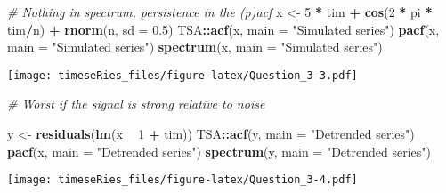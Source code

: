 \documentclass[]{book}
\newenvironment{Shaded}{\begin{snugshade}}{\end{snugshade}}
\newcommand{\KeywordTok}[1]{\textcolor[rgb]{0.13,0.29,0.53}{\textbf{#1}}}
\newcommand{\DataTypeTok}[1]{\textcolor[rgb]{0.13,0.29,0.53}{#1}}
\newcommand{\DecValTok}[1]{\textcolor[rgb]{0.00,0.00,0.81}{#1}}
\newcommand{\FloatTok}[1]{\textcolor[rgb]{0.00,0.00,0.81}{#1}}
\newcommand{\StringTok}[1]{\textcolor[rgb]{0.31,0.60,0.02}{#1}}
\newcommand{\CommentTok}[1]{\textcolor[rgb]{0.56,0.35,0.01}{\textit{#1}}}
\newcommand{\OperatorTok}[1]{\textcolor[rgb]{0.81,0.36,0.00}{\textbf{#1}}}
\newcommand{\NormalTok}[1]{#1}
\begin{document}
\begin{Shaded}
\begin{Highlighting}[]
\CommentTok{# Nothing in spectrum, persistence in the (p)acf}
\NormalTok{x <-}\StringTok{ }\DecValTok{5} \OperatorTok{*}\StringTok{ }\NormalTok{tim }\OperatorTok{+}\StringTok{ }\KeywordTok{cos}\NormalTok{(}\DecValTok{2} \OperatorTok{*}\StringTok{ }\NormalTok{pi }\OperatorTok{*}\StringTok{ }\NormalTok{tim}\OperatorTok{/}\NormalTok{n) }\OperatorTok{+}\StringTok{ }\KeywordTok{rnorm}\NormalTok{(n, }\DataTypeTok{sd =} \FloatTok{0.5}\NormalTok{)}
\NormalTok{TSA}\OperatorTok{::}\KeywordTok{acf}\NormalTok{(x, }\DataTypeTok{main =} \StringTok{"Simulated series"}\NormalTok{)}
\KeywordTok{pacf}\NormalTok{(x, }\DataTypeTok{main =} \StringTok{"Simulated series"}\NormalTok{)}
\KeywordTok{spectrum}\NormalTok{(x, }\DataTypeTok{main =} \StringTok{"Simulated series"}\NormalTok{)}
\end{Highlighting}
\end{Shaded}

\texttt{[image: timeseRies\_files/figure-latex/Question\_3-3.pdf]}

\begin{Shaded}
\begin{Highlighting}[]
\CommentTok{# Worst if the signal is strong relative to noise}

\NormalTok{y <-}\StringTok{ }\KeywordTok{residuals}\NormalTok{(}\KeywordTok{lm}\NormalTok{(x }\OperatorTok{~}\StringTok{ }\DecValTok{1} \OperatorTok{+}\StringTok{ }\NormalTok{tim))}
\NormalTok{TSA}\OperatorTok{::}\KeywordTok{acf}\NormalTok{(y, }\DataTypeTok{main =} \StringTok{"Detrended series"}\NormalTok{)}
\KeywordTok{pacf}\NormalTok{(x, }\DataTypeTok{main =} \StringTok{"Detrended series"}\NormalTok{)}
\KeywordTok{spectrum}\NormalTok{(y, }\DataTypeTok{main =} \StringTok{"Detrended series"}\NormalTok{)}
\end{Highlighting}
\end{Shaded}

\texttt{[image: timeseRies\_files/figure-latex/Question\_3-4.pdf]}
\end{document}
